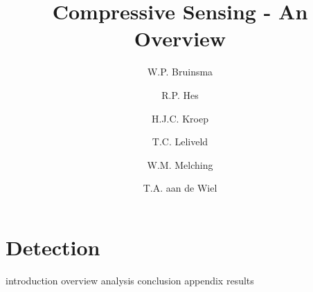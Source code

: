 \documentclass[a4paper, openany, oneside]{memoir}
\title{Compressive Sensing - An Overview}
\author{W.P. Bruinsma \and R.P. Hes \and H.J.C. Kroep \and T.C. Leliveld \and W.M. Melching \and T.A. aan de Wiel}
\begin{document}
\chapter{Detection}
\label{cha:detection}
{introduction}
{overview}
{analysis}
{conclusion}
{appendix}
{results}
\end{document}
